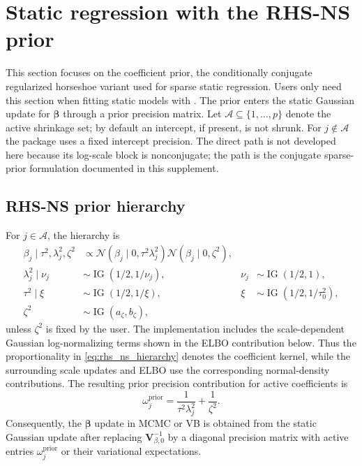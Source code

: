\documentclass[nojss,noheadings]{jss}
\newcommand{\vect}[1]{\bm{#1}}
\newcommand{\mat}[1]{\mathbf{#1}}
\newcommand{\N}{\mathcal{N}}
\newcommand{\IG}{\operatorname{IG}}
\begin{document}
\section{Static regression with the RHS-NS prior}
\label{sec:static_rhs}

This section focuses on the  coefficient prior, the
conditionally conjugate regularized horseshoe variant used for sparse static
regression. Users only need this section when fitting static models with
. The prior enters the static Gaussian update for
$\vect{\beta}$ through a prior precision matrix. Let
$\mathcal{A}\subseteq\{1,\ldots,p\}$ denote the active shrinkage set; by
default an intercept, if present, is not shrunk. For $j\notin\mathcal{A}$ the
package uses a fixed intercept precision. The direct  path is not
developed here because its log-scale block is nonconjugate; the
 path is the conjugate sparse-prior formulation documented in
this supplement.

\subsection{RHS-NS prior hierarchy}

For $j\in\mathcal{A}$, the  hierarchy is
\begin{align}
\beta_j\mid\tau^2,\lambda_j^2,\zeta^2
&\propto
\N(\beta_j\mid0,\tau^2\lambda_j^2)
\N(\beta_j\mid0,\zeta^2),\\
\lambda_j^2\mid\nu_j &\sim \IG(1/2,1/\nu_j),&
\nu_j&\sim\IG(1/2,1),\\
\tau^2\mid\xi &\sim\IG(1/2,1/\xi),&
\xi&\sim\IG(1/2,1/\tau_0^2),\\
\zeta^2&\sim\IG(a_\zeta,b_\zeta),
\label{eq:rhs_ns_hierarchy}
\end{align}
unless $\zeta^2$ is fixed by the user. The implementation includes the
scale-dependent Gaussian log-normalizing terms shown in the ELBO contribution
below. Thus the proportionality in \eqref{eq:rhs_ns_hierarchy} denotes the
coefficient kernel, while the surrounding scale updates and ELBO use the
corresponding normal-density contributions. The resulting prior precision
contribution for active coefficients is
\begin{equation}
\omega^{\mathrm{prior}}_j=\frac{1}{\tau^2\lambda_j^2}+\frac{1}{\zeta^2}.
\label{eq:rhs_ns_precision}
\end{equation}
Consequently, the $\vect{\beta}$ update in MCMC or VB is obtained from the
static Gaussian update after replacing $\mat{V}_{\beta,0}^{-1}$ by a diagonal precision
matrix with active entries $\omega^{\mathrm{prior}}_j$ or their variational
expectations.
\end{document}
